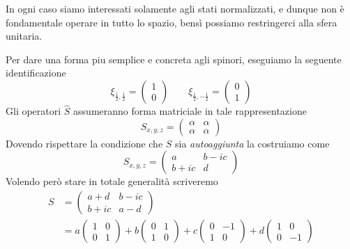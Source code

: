 In ogni caso siamo interessati solamente agli stati normalizzati, e
dunque non è fondamentale operare in tutto lo spazio, bensì possiamo
restringerci alla sfera unitaria.

Per dare una forma piu semplice e concreta agli spinori, eseguiamo la
seguente identificazione \[
	\xi_{\frac{1}{2}, \frac{1}{2}} =
	\begin{pmatrix}
		1 \\ 0
	\end{pmatrix} \qquad
	\xi_{\frac{1}{2}, - \frac{1}{2}} =
	\begin{pmatrix}
		0 \\ 1
	\end{pmatrix}
\] Gli operatori \(\hat{S}\) assumeranno forma matriciale in tale
rappresentazione \[
	S_{x,y,z} =
	\begin{pmatrix}
		\alpha & \alpha \\
		\alpha & \alpha
	\end{pmatrix}
\] Dovendo rispettare la condizione che \(S\) sia \emph{autoaggiunta} la
costruiamo come \[
	S_{x,y,z} =
	\begin{pmatrix}
		a      & b - ic \\
		b + ic & d
	\end{pmatrix}
\] Volendo però stare in totale generalità scriveremo
\begin{align*}
	S & =
	\begin{pmatrix}
		a + d & b-ic \\
		b+ic  & a-d
	\end{pmatrix} \\
	  & =
	a
	\begin{pmatrix}
		1 & 0 \\
		0 & 1
	\end{pmatrix}
	+ b \begin{pmatrix}
		    0 & 1 \\
		    1 & 0
	    \end{pmatrix}
	+ c \begin{pmatrix}
		    0 & -1 \\
		    1 & 0
	    \end{pmatrix}
	+d \begin{pmatrix}
		   1 & 0  \\
		   0 & -1
	   \end{pmatrix}
\end{align*}

